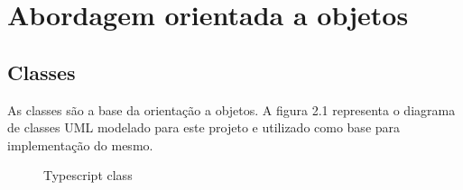 \documentclass[rel_mlp]{iiufrgs}
\numberwithin{figure}{chapter}
\begin{document}
%
\chapter{Abordagem orientada a objetos}

\section{Classes}

As classes são a base da orientação a objetos. A figura 2.1 representa o diagrama de classes UML modelado para este projeto e utilizado como base para implementação do mesmo.
\begin{figure}[ht]
%
%
\caption{Typescript class}
\label{fig:tsClass}
\end{figure}
\end{document}
